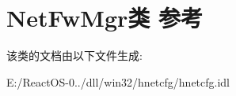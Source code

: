 \hypertarget{class_net_fw_mgr}{}\section{Net\+Fw\+Mgr类 参考}
\label{class_net_fw_mgr}


该类的文档由以下文件生成\+:\begin{DoxyCompactItemize}
\item 
E\+:/\+React\+O\+S-\/0../dll/win32/hnetcfg/hnetcfg.\+idl\end{DoxyCompactItemize}

